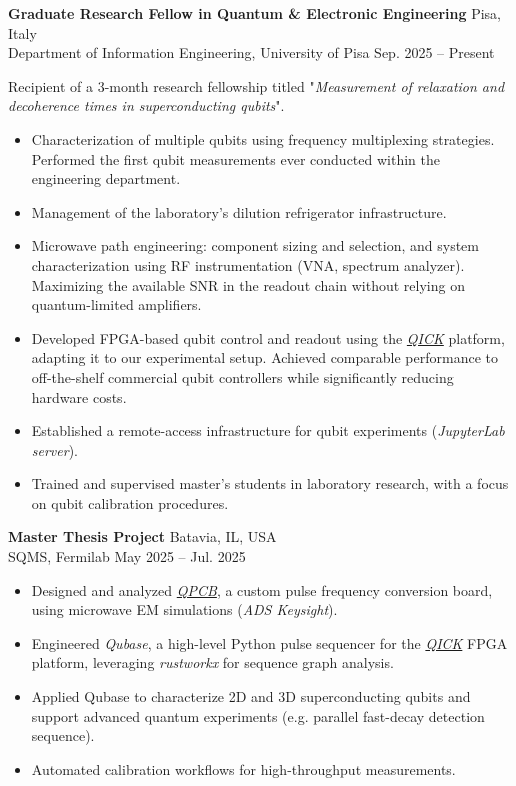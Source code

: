 \documentclass[11pt]{article}
\newcommand{\entry}[4]{{{\textbf{#1}}} \hfill #3 \\ #2 \hfill #4}
\begin{document}

	\entry{Graduate Research Fellow in Quantum \& Electronic Engineering}{Department of Information Engineering, University of Pisa}{Pisa, Italy}{Sep. 2025 -- Present}
	
	\smallskip
	Recipient of a 3-month research fellowship titled "\textit{Measurement of relaxation and decoherence times in superconducting qubits}".
	\begin{itemize}[noitemsep,leftmargin=10.0mm,rightmargin=0mm,topsep=6pt]
		\item Characterization of multiple qubits using frequency multiplexing strategies. Performed the first qubit measurements ever conducted within the engineering department.
		\item Management of the laboratory's dilution refrigerator infrastructure.
		\item Microwave path engineering: component sizing and selection, and system characterization using RF instrumentation (VNA, spectrum analyzer). Maximizing the available SNR in the readout chain without relying on quantum-limited amplifiers.
		\item Developed FPGA-based qubit control and readout using the \textit{\href{https://github.com/openquantumhardware/qick}{QICK}} platform, adapting it to our experimental setup. Achieved comparable performance to off-the-shelf commercial qubit controllers while significantly reducing hardware costs.
		\item Established a remote-access infrastructure for qubit experiments (\textit{JupyterLab server}).
		\item Trained and supervised master’s students in laboratory research, with a focus on qubit calibration procedures.
	\end{itemize}


	\entry{Master Thesis Project}{SQMS, Fermilab}{Batavia, IL, USA}{May 2025 -- Jul. 2025}
	\begin{itemize}[noitemsep,leftmargin=10.0mm,rightmargin=0mm,topsep=6pt]
		\item Designed and analyzed \textit{\href{https://github.com/leonardobove/qpcb}{QPCB}}, a custom pulse frequency conversion board, using microwave EM simulations (\textit{ADS Keysight}).
		\item Engineered \textit{Qubase}, a high-level Python pulse sequencer for the \textit{\href{https://github.com/openquantumhardware/qick}{QICK}} FPGA platform, leveraging \textit{rustworkx} for sequence graph analysis.
		\item Applied Qubase to characterize 2D and 3D superconducting qubits and support advanced quantum experiments (e.g. parallel fast-decay detection sequence).
		\item Automated calibration workflows for high-throughput measurements.
	\end{itemize}
	
\end{document}
